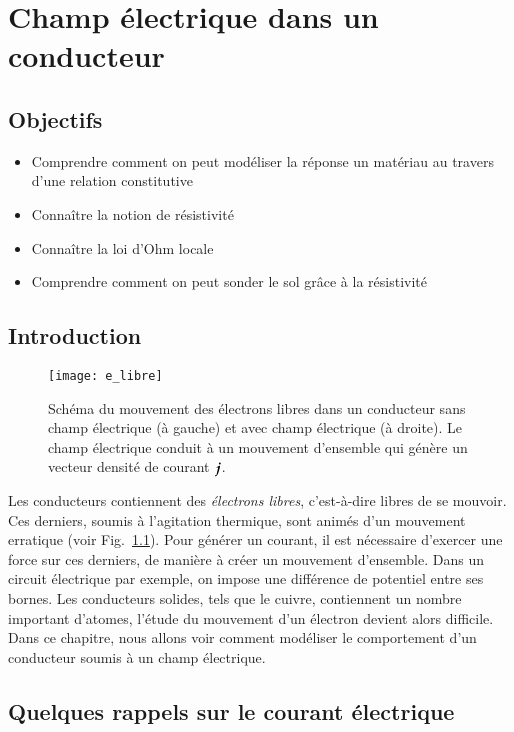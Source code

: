 \chapter{Champ électrique dans un conducteur}
\label{chap:metaux}
\section*{Objectifs}
\begin{itemize}
	\item Comprendre comment on peut modéliser la réponse 
	  un matériau au travers d'une relation constitutive
	\item Connaître la notion de résistivité
	\item Connaître la loi d'Ohm locale
	\item Comprendre comment on peut sonder le sol grâce à la résistivité
\end{itemize}

\section*{Introduction}
\begin{figure}[]
	\centering
	\texttt{[image: e\_libre]}
	\caption{Schéma du mouvement des électrons libres dans un conducteur
		 sans champ électrique (à gauche) et avec champ électrique 
	 	 (à droite). Le champ électrique conduit à un mouvement 
	 	d'ensemble qui génère un vecteur densité de courant $\mitbf{j}$.}%
	\label{fig:e_libre}
\end{figure}

Les conducteurs contiennent des \emph{électrons libres}, c'est-à-dire libres de se 
mouvoir. Ces derniers, soumis à l'agitation thermique, sont animés d'un mouvement
erratique (voir Fig.~\ref{fig:e_libre}). 
Pour générer un courant, il est nécessaire
d'exercer une force sur ces derniers, de manière à créer un mouvement d'ensemble.
Dans un circuit électrique par exemple, on impose une différence de potentiel 
entre ses bornes. Les conducteurs solides, tels que le cuivre, contiennent
un nombre important d'atomes, l'étude du mouvement d'un électron devient alors 
difficile.
Dans ce chapitre, nous allons voir comment modéliser le comportement d'un conducteur 
soumis à un champ électrique.
\section{Quelques rappels sur le courant électrique}

